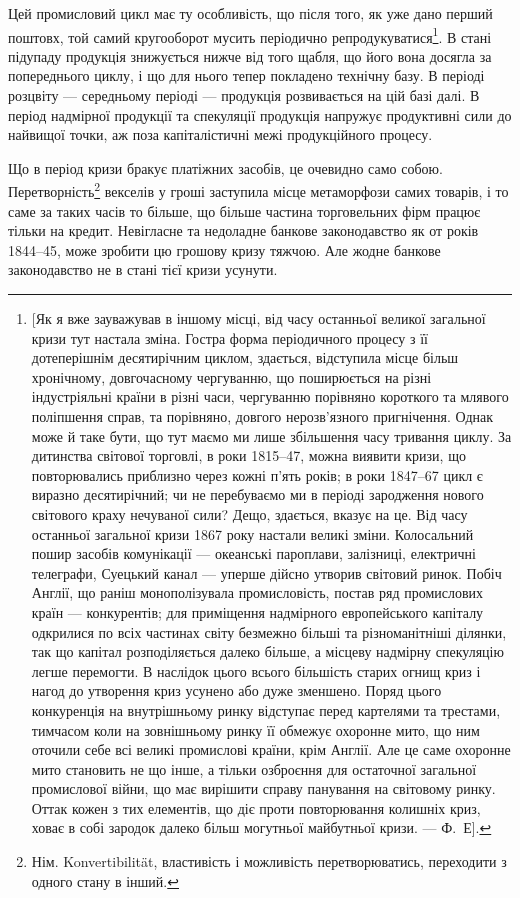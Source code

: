 Цей промисловий цикл має ту особливість, що після того, як уже дано перший
поштовх, той самий кругооборот мусить періодично репродукуватися\footnote{
[Як я вже зауважував в іншому місці, від часу останньої великої загальної кризи тут настала
зміна. Гостра форма періодичного процесу з її дотеперішнім десятирічним циклом, здається, відступила
місце більш хронічному, довгочасному чергуванню, що поширюється на різні індустріяльні країни в
різні
часи, чергуванню порівняно короткого та млявого поліпшення справ, та порівняно, довгого
нерозв'язного
пригнічення. Однак може й таке бути, що тут маємо ми лише збільшення часу тривання циклу. За
дитинства
світової торговлі, в роки 1815--47, можна виявити кризи, що повторювались приблизно через
кожні п’ять років; в роки 1847--67 цикл є виразно десятирічний; чи не перебуваємо ми в періоді
зародження нового світового краху нечуваної сили? Дещо, здається, вказує на це. Від часу останньої
загальної кризи 1867 року настали великі зміни. Колосальний пошир засобів комунікації — океанські
пароплави,
залізниці, електричні телеграфи, Суецький канал — уперше дійсно утворив світовий ринок. Побіч
Англії, що раніш монополізувала промисловість, постав ряд промислових країн — конкурентів; для
приміщення надмірного европейського капіталу одкрилися по всіх частинах світу безмежно більші та
різноманітніші ділянки, так що капітал розподіляється далеко більше, а місцеву надмірну спекуляцію
легше перемогти. В наслідок цього всього більшість старих огнищ криз і нагод до утворення криз
усунено
або дуже зменшено. Поряд цього конкуренція на внутрішньому ринку відступає перед картелями та
трестами, тимчасом коли на зовнішньому ринку її обмежує охоронне мито, що ним оточили себе всі
великі
промислові країни, крім Англії. Але це саме охоронне мито становить не що інше, а тільки озброєння
для остаточної загальної промислової війни, що має вирішити справу панування на світовому ринку.
Оттак кожен з тих елементів, що діє проти повторювання колишніх криз, ховає в собі зародок далеко
більш могутньої майбутньої кризи. — Ф.~Е].
}. В стані
підупаду продукція знижується нижче від того щабля, що його вона досягла
за попереднього циклу, і що для нього тепер покладено технічну базу. В періоді
розцвіту — середньому періоді — продукція розвивається на цій базі далі. В період
надмірної продукції та спекуляції продукція напружує продуктивні сили до найвищої
точки, аж поза капіталістичні межі продукційного процесу.

Що в період кризи бракує платіжних засобів, це очевидно само собою.
Перетворність\footnote*{
Нім. Konvertibilität, властивість і можливість перетворюватись, переходити
з одного стану в інший. 
} векселів у гроші заступила місце метаморфози самих товарів,
і то саме за таких часів то більше, що більше частина торговельних фірм працює
тільки на кредит. Невігласне та недоладне банкове законодавство як от
років 1844--45, може зробити цю грошову кризу тяжчою. Але жодне банкове
законодавство не в стані тієї кризи усунути.

